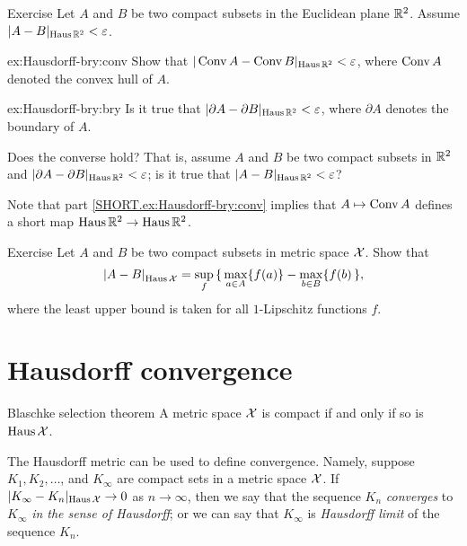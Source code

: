 \begin{thm}{Exercise}\label{ex:Hausdorff-bry}
Let $A$ and $B$ be two compact subsets in the Euclidean plane $\mathbb{R}^2$.
Assume $|A-B|_{\operatorname{\rm Haus}\nolimits\mathbb{R}^2}<\varepsilon$.

\begin{subthm}{ex:Hausdorff-bry:conv}
Show that $|\mathop{\rm Conv}\nolimits A-\mathop{\rm Conv}\nolimits B|_{\operatorname{\rm Haus}\nolimits\mathbb{R}^2}<\varepsilon$, where $\mathop{\rm Conv}\nolimits A$ denoted the convex hull of $A$.
\end{subthm}
\begin{subthm}{ex:Hausdorff-bry:bry}
Is it true that
$|\partial A-\partial B|_{\operatorname{\rm Haus}\nolimits\mathbb{R}^2}<\varepsilon$,
where $\partial A$ denotes the boundary of $A$.

Does the converse hold? That is, assume $A$ and $B$ be two compact subsets in $\mathbb{R}^2$
and $|\partial A-\partial B|_{\operatorname{\rm Haus}\nolimits\mathbb{R}^2}<\varepsilon$; 
is it true that $|A-B|_{\Haus\RR^2}\z<\eps$?
\end{subthm}

\end{thm}

Note that part \ref{SHORT.ex:Hausdorff-bry:conv} implies that $A\mapsto \mathop{\rm Conv}\nolimits A$ defines a short map $\operatorname{\rm Haus}\nolimits\mathbb{R}^2\to \operatorname{\rm Haus}\nolimits\mathbb{R}^2$. 

\begin{thm}{Exercise}\label{ex:Haus-func}
Let $A$ and $B$ be two compact subsets in metric space $\mathcal{X}$.
Show that 
\[\dist{A}{B}{\Haus\spc{X}}=\sup_f\, \{\,\max_{a\in A}\{f(a)\}-\max_{b\in B}\{f(b)\,\},\]
where the least upper bound is taken for all $1$-Lipschitz functions $f$.

\end{thm}


\section{Hausdorff convergence}

\begin{thm}{Blaschke selection theorem}\label{thm:compact+Hausdorff}
A metric space $\mathcal{X}$ is compact if and only if
so is $\operatorname{\rm Haus}\nolimits\mathcal{X}$.
\end{thm}

The Hausdorff metric can be used to define convergence.
Namely, suppose $K_1,K_2,\dots$, and $K_\infty$ are compact sets in a metric space $\mathcal{X}$.
If $|K_\infty-K_n|_{\operatorname{\rm Haus}\nolimits\mathcal{X}}\to0$ as $n\to\infty$, then we say that 
the sequence $K_n$ {}\emph{converges} to $K_\infty$ \emph{in the sense of Hausdorff};
or we can say that $K_\infty$ is \emph{Hausdorff limit} of the sequence $K_n$.

